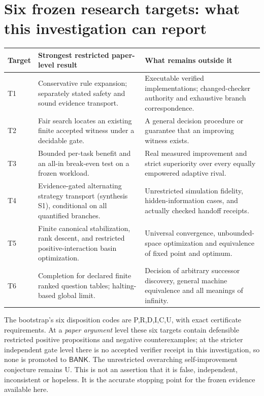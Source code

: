 \documentclass[11pt,letterpaper]{article}
\theoremstyle{definition}
\theoremstyle{remark}
\newcommand{\Bank}{\mathsf{BANK}}
\begin{document}
\section{Six frozen research targets: what this investigation can report}
\small
\begin{longtable}{p{}p{}p{}}
\toprule Target & Strongest restricted paper-level result & What remains outside it \\\midrule\endhead
T1 & Conservative rule expansion; separately stated safety and sound evidence transport. & Executable verified implementations; changed-checker authority and exhaustive branch correspondence.\\
T2 & Fair search locates an existing finite accepted witness under a decidable gate. & A general decision procedure or guarantee that an improving witness exists.\\
T3 & Bounded per-task benefit and an all-in break-even test on a frozen workload. & Real measured improvement and strict superiority over every equally empowered adaptive rival.\\
T4 & Evidence-gated alternating strategy transport (synthesis S1), conditional on all quantified branches. & Unrestricted simulation fidelity, hidden-information cases, and actually checked handoff receipts.\\
T5 & Finite canonical stabilization, rank descent, and restricted positive-interaction basin optimization. & Universal convergence, unbounded-space optimization and equivalence of fixed point and optimum.\\
T6 & Completion for declared finite ranked question tables; halting-based global limit. & Decision of arbitrary successor discovery, general machine equivalence and all meanings of infinity.\\\bottomrule
\end{longtable}
\normalsize

The bootstrap's six disposition codes are \textsf{P,R,D,I,C,U}, with exact certificate requirements. At a \emph{paper argument} level these six targets contain defensible restricted positive propositions and negative counterexamples; at the stricter independent gate level there is no accepted verifier receipt in this investigation, so none is promoted to $\Bank$. The unrestricted overarching self-improvement conjecture remains \textsf{U}. This is not an assertion that it is false, independent, inconsistent or hopeless. It is the accurate stopping point for the frozen evidence available here.
\end{document}
